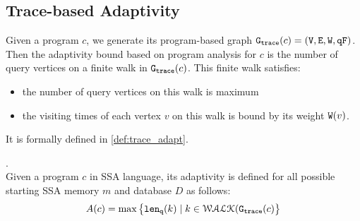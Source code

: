 %
\subsection{Trace-based Adaptivity}
Given a program $c$, we generate its program-based graph 
$\mathtt{{G_{trace}}}({c}) = (\mathtt{V}, \mathtt{E}, \mathtt{W}, \mathtt{qF})$.
%
Then the adaptivity bound based on program analysis for ${c}$ is the number of query vertices on a finite walk in $\mathtt{{G_{trace}}}({c})$. This finite walk satisfies:
%
\begin{itemize}
\item the number of query vertices on this walk is maximum
\item the visiting times of each vertex $v$ on this walk is bound by its weight $\mathtt{W}(v)$.
\end{itemize}
%
It is formally defined in \ref{def:trace_adapt}.
%
\begin{defn}
.
\label{def:trace_adapt}
\\
Given a program ${c}$ in SSA language, 
its adaptivity is defined for all possible starting SSA memory ${m}$ and database $D$ as follows:
%
$$
A(c) = \max \big 
\{ \mathtt{len}_{\tt q}(k) \mid k \in \mathcal{WALK}(\mathtt{{G_{trace}}}(c) \big \} 
$$
\end{defn}

%
%
%
%
%
%
%
%
% 
%
\clearpage
